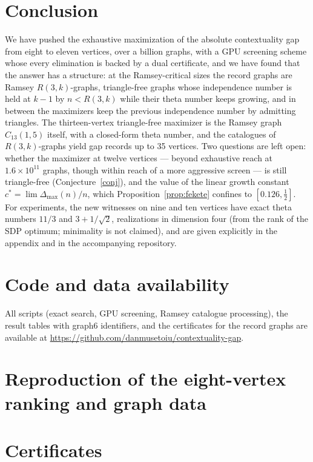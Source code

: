 \documentclass[11pt]{article}
\newcommand{\gap}{\Delta}
\begin{document}
\section{Conclusion}
We have pushed the exhaustive maximization of the absolute contextuality gap from eight to eleven vertices, over a billion graphs, with a GPU screening scheme whose every elimination is backed by a dual certificate, and we have found that the answer has a structure: at the Ramsey-critical sizes the record graphs are Ramsey $R(3,k)$-graphs, triangle-free graphs whose independence number is held at $k-1$ by $n<R(3,k)$ while their theta number keeps growing, and in between the maximizers keep the previous independence number by admitting triangles. The thirteen-vertex triangle-free maximizer is the Ramsey graph $C_{13}(1,5)$ itself, with a closed-form theta number, and the catalogues of $R(3,k)$-graphs yield gap records up to 35 vertices. Two questions are left open: whether the maximizer at twelve vertices --- beyond exhaustive reach at $1.6\times10^{11}$ graphs, though within reach of a more aggressive screen --- is still triangle-free (Conjecture~\ref{conj}), and the value of the linear growth constant $c^*=\lim\gap_{\max}(n)/n$, which Proposition~\ref{prop:fekete} confines to $[0.126,\tfrac12]$. For experiments, the new witnesses on nine and ten vertices have exact theta numbers $11/3$ and $3+1/\sqrt2$, realizations in dimension four (from the rank of the SDP optimum; minimality is not claimed), and are given explicitly in the appendix and in the accompanying repository.

\section*{Code and data availability}
All scripts (exact search, GPU screening, Ramsey catalogue processing), the result tables with graph6 identifiers, and the certificates for the record graphs are available at \url{https://github.com/danmusetoiu/contextuality-gap}.

\appendix
\section{Reproduction of the eight-vertex ranking and graph data}\label{app:n8}\label{app:g6}


\section{Certificates}\label{app:cert}

\end{document}
